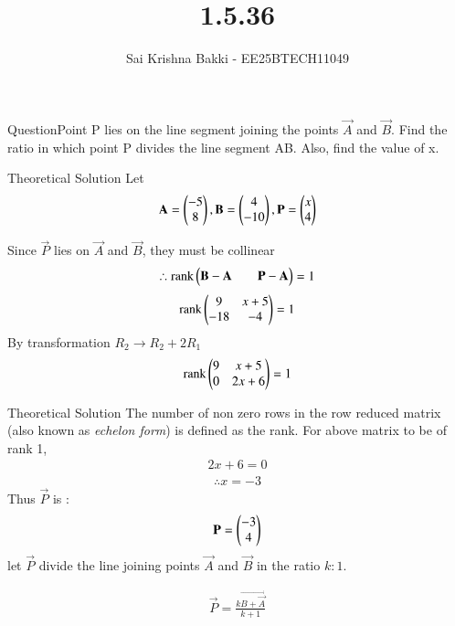 \documentclass{beamer}
\title %
{1.5.36}
\date{}
\author %
{Sai Krishna Bakki - EE25BTECH11049}
\begin{document}
\frame{\titlepage}
\begin{frame}{Question}Point P lies on the line segment joining the points $\vec{A}$ and $\vec{B}$. Find the ratio in which point P divides the line segment AB. Also, find the value of x.
\end{frame}
\begin{frame}{Theoretical Solution}
Let 
\begin{align}
\mathbf{A}= \begin{pmatrix}-5 \\ 8\end{pmatrix}, \mathbf{B}= \begin{pmatrix}4 \\ -10\end{pmatrix} , \mathbf{P} = \begin{pmatrix}x \\ 4\end{pmatrix}
\end{align}    

Since $\vec{P}$ lies on $\vec{A}$ and $\vec{B}$, they must be collinear
\begin{align}
\therefore \text{rank}\begin{pmatrix}\mathbf{B} - \mathbf{A} & &\mathbf{P} - \mathbf{A}\end{pmatrix} = 1
\end{align}
\begin{align}
    \text{rank}\begin{pmatrix}9 & x+5 \\ -18 & -4\end{pmatrix} = 1
\end{align}
By transformation $R_2 \rightarrow R_2 + 2R_1$
\begin{align}
    \text{rank}\begin{pmatrix}9 & x+5 \\ 0 & 2x+6\end{pmatrix} = 1
\end{align}
\end{frame}
\begin{frame}{Theoretical Solution}
The number of non zero rows in the row reduced matrix (also known as {\em echelon form}) is defined as the rank. For above matrix to be of rank 1,
 \begin{align}
    2x+6 = 0
\end{align}
\begin{align}
\therefore x = -3
\end{align}
Thus $\vec{P}$ is :
\begin{align}
    \mathbf{P} = \begin{pmatrix}-3 \\ 4\end{pmatrix}
\end{align}
let $\vec{P}$ divide the line joining points $\vec{A}$ and $\vec{B}$ in the ratio $k:1$.

\begin{align}
    \vec{P}=\frac{k\vec{B+\vec{A}}}{k+1}
\end{align}

\end{frame}
\end{document}
